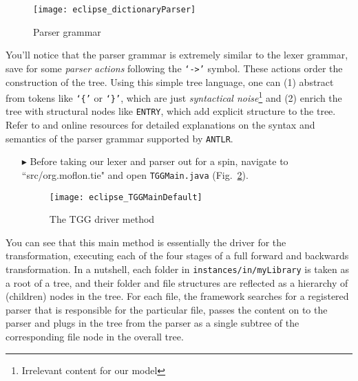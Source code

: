 \begin{figure}[!htbp]
\begin{center}
 \texttt{[image: eclipse\_dictionaryParser]}
  \caption{Parser grammar}
  \label{eclipse:dictParser}
\end{center}
\end{figure}

\newpage

You'll notice that the parser grammar is extremely similar to the lexer grammar, save for some \emph{parser actions} following the \texttt{`->'} symbol. These
actions order the construction of the tree. Using this simple tree language, one can (1) abstract from tokens like \texttt{`\{'} or \texttt{`\}'}, which are
just \emph{syntactical noise}\footnote{Irrelevant content for our model} and (2) enrich the tree with structural nodes like \texttt{ENTRY}, which add explicit
structure to the tree. Refer to \cite{ANTLR} and online resources for detailed explanations on the syntax and semantics of the parser grammar supported by
\texttt{ANTLR}.

\begin{itemize}


\item[$\blacktriangleright$] Before taking our lexer and parser out for a spin, navigate to ``src/org.moflon.tie" and open \texttt{TGGMain.java}
(Fig.~\ref{eclipse:defaultTGGMain}).

\vspace{0.5cm}

\begin{figure}[!htbp]
\begin{center}
 \texttt{[image: eclipse\_TGGMainDefault]}
  \caption{The TGG driver method}
  \label{eclipse:defaultTGGMain}
\end{center}
\end{figure}

\end{itemize}

You can see that this main method is essentially the driver for the transformation, executing each of the four stages of a full forward and backwards
transformation. In a nutshell, each folder in \texttt{instances/in/myLibrary} is taken as a root of a tree, and their folder and file structures are reflected
as a hierarchy of (children) nodes in the tree. For each file, the framework searches for a registered parser that is responsible for the particular file,
passes the content on to the parser and plugs in the tree from the parser as a single subtree of the corresponding file node in the overall tree.

